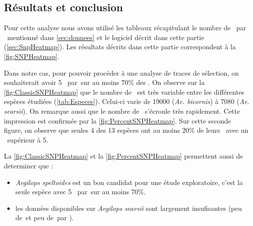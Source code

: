 \documentclass[../main]{subfiles} %
\begin{document}
\subsection{Résultats et conclusion}
\label{sec:SNP_Results}
Pour cette analyse nous avons utilisé les tableaux récapitulant le nombre de \SNP par \contig mentionné dans \ref{sec:donnees} et le logiciel décrit dans cette partie (\cref{sec:SnpHeatmap}). Les résultats décrits dans cette partie correspondent à la \cref{fig:SNPHeatmap}.

Dans notre cas, pour pouvoir procéder à une analyse de  traces de sélection, on souhaiterait avoir 5 \SNP par \contigs\,sur au moins 70\% des \contigs.
On observe sur la \cref{fig:ClassicSNPHeatmap} que le nombre de \contigs est très variable entre les différentes espèces étudiées (\ref{tab:Especes}). Celui-ci varie de \num{19 000} (\textit{Ae. bicornis}) à \num{7 080} (\textit{Ae. searsii}). On remarque aussi que le nombre de \SNP s'écroule très rapidement. Cette impression est confirmée par la \cref{fig:PercentSNPHeatmap}. Sur cette seconde figure, on observe que seules 4 des 13 espèces ont au moins 20\% de leurs \contigs avec un \NbSNP supérieur à \num{5}.

La \cref{fig:ClassicSNPHeatmap} et la \cref{fig:PercentSNPHeatmap} permettent aussi de determiner que :

\begin{itemize}
\item \textit{Aegilops speltoides} est un bon candidat pour une étude exploratoire, c'est la seule espèce avec 5 \SNP par \contigs\,sur au moins 70\%.

\item les données disponibles sur \textit{Aegilops searsii} sont largement insufisantes (peu de \reads\,et peu de \SNP\,par \contigs ).

\end{itemize}


\end{document}
